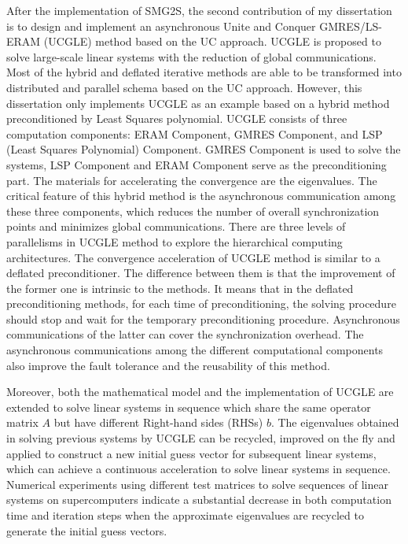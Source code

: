 After the implementation of SMG2S, the second contribution of my dissertation is to design and implement an asynchronous Unite and Conquer GMRES/LS-ERAM (UCGLE) method based on the UC approach. UCGLE is proposed to solve large-scale linear systems with the reduction of global communications. Most of the hybrid and deflated iterative methods are able to be transformed into distributed and parallel schema based on the UC approach. However, this dissertation only implements UCGLE as an example based on a hybrid method preconditioned by Least Squares polynomial. UCGLE consists of three computation components: ERAM Component, GMRES Component, and LSP (Least Squares Polynomial) Component. GMRES Component is used to solve the systems, LSP Component and ERAM Component serve as the preconditioning part. The materials for accelerating the convergence are the eigenvalues. The critical feature of this hybrid method is the asynchronous communication among these three components, which reduces the number of overall synchronization points and minimizes global communications. There are three levels of parallelisms in UCGLE method to explore the hierarchical computing architectures. The convergence acceleration of UCGLE method is similar to a deflated preconditioner. The difference between them is that the improvement of the former one is intrinsic to the methods. It means that in the deflated preconditioning methods, for each time of preconditioning, the solving procedure should stop and wait for the temporary preconditioning procedure. Asynchronous communications of the latter can cover the synchronization overhead. The asynchronous communications among the different computational components also improve the fault tolerance and the reusability of this method. 


Moreover, both the mathematical model and the implementation of UCGLE are extended to solve linear systems in sequence which share the same operator matrix $A$ but have different Right-hand sides (RHSs) $b$. The eigenvalues obtained in solving previous systems by UCGLE can be recycled, improved on the fly and applied to construct a new initial guess vector for subsequent linear systems, which can achieve a continuous acceleration to solve linear systems in sequence. Numerical experiments using different test matrices to solve sequences of linear systems on supercomputers indicate a substantial decrease in both computation time and iteration steps when the approximate eigenvalues are recycled to generate the initial guess vectors.

